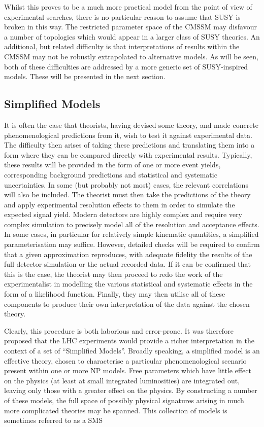 Whilst this proves to be a much more practical model from the point of view of
experimental searches, there is no particular reason to assume that \ac{SUSY} is
broken in this way. The restricted parameter space of the \ac{CMSSM} may
disfavour a number of topologies which would appear in a larger class of
\ac{SUSY} theories. An additional, but related difficulty is that
interpretations of results within the \ac{CMSSM} may not be robustly
extrapolated to alternative models. As will be seen, both of these difficulties
are addressed by a more generic set of \ac{SUSY}-inspired models. These will be
presented in the next section.

\subsection{Simplified Models}
\label{sec:sms}
It is often the case that theorists, having devised some theory, and made
concrete phenomenological predictions from it, wish to test it against
experimental data. The difficulty then arises of taking these predictions and
translating them into a form where they can be compared directly with
experimental results. Typically, these results will be provided in the form of
one or more event yields, corresponding background predictions and statistical
and systematic uncertainties. In some (but probably not most) cases, the
relevant correlations will also be included. The theorist must then take the
predictions of the theory and apply experimental resolution effects to them in
order to simulate the expected signal yield. Modern detectors are highly complex
and require very complex simulation to precisely model all of the resolution and
acceptance effects. In some cases, in particular for relatively simple kinematic
quantities, a simplified parameterisation may suffice. However, detailed checks
will be required to confirm that a given approximation reproduces, with adequate
fidelity the results of the full detector simulation or the actual recorded
data. If it can be confirmed that this is the case, the theorist may then
proceed to redo the work of the experimentalist in modelling the various
statistical and systematic effects in the form of a likelihood
function. Finally, they may then utilise all of these components to produce
their own interpretation of the data against the chosen theory.

Clearly, this procedure is both laborious and error-prone. It was therefore
proposed that the \ac{LHC} experiments would provide a richer interpretation in
the context of a set of ``Simplified Models''. Broadly speaking, a simplified
model is an effective theory, chosen to characterise a particular
phenomenological scenario present within one or more \ac{NP} models. Free
parameters which have little effect on the physics (at least at small integrated
luminosities) are integrated out, leaving only those with a greater effect on
the physics. By constructing a number of these models, the full space of
possibly physical signatures arising in much more complicated theories may be
spanned. This collection of models is sometimes referred to as a \acf{SMS}

